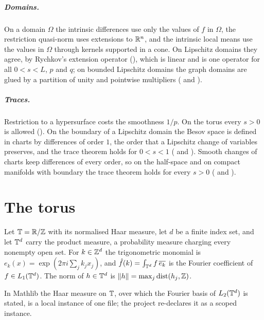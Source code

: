 \paragraph{Domains.} On a domain $\Omega$ the intrinsic differences use only the values of $f$ in
$\Omega$, the restriction quasi-norm uses extensions to $\mathbb{R}^n$, and the intrinsic local means use
the values in $\Omega$ through kernels supported in a cone. On Lipschitz domains they agree, by
Rychkov's extension operator (), which is linear and is one operator for
all $0 < s < L$, $p$ and $q$; on bounded Lipschitz domains the graph domains are glued by a
partition of unity and pointwise multipliers ( and
).

\paragraph{Traces.} Restriction to a hypersurface costs the smoothness $1/p$. On the torus every
$s > 0$ is allowed (). On the boundary of a Lipschitz domain the Besov space
is defined in charts by differences of order $1$, the order that a Lipschitz change of variables
preserves, and the trace theorem holds for $0 < s < 1$
( and ). Smooth changes of charts keep
differences of every order, so on the half-space and on compact manifolds with boundary the trace
theorem holds for every $s > 0$ ( and ).

\chapter{The torus}
\label{ch:torus}

Let $\mathbb{T} = \mathbb{R} / \mathbb{Z}$ with its normalised Haar measure, let $d$ be a finite index set, and let
$\mathbb{T}^d$ carry the product measure, a probability measure charging every nonempty open set.
For $k \in \mathbb{Z}^d$ the trigonometric monomial is $e_k(x) = \exp(2\pi i \sum_j k_j x_j)$, and
$\hat f(k) = \int_{\mathbb{T}^d} f \, \overline{e_k}$ is the Fourier coefficient of $f \in
L_1(\mathbb{T}^d)$. The norm of $h \in \mathbb{T}^d$ is $\|h\| = \max_j \operatorname{dist}(h_j, \mathbb{Z})$.

In Mathlib the Haar measure on $\mathbb{T}$, over which the Fourier basis of $L_2(\mathbb{T}^d)$ is stated, is
a local instance of one file; the project re-declares it as a scoped instance.

